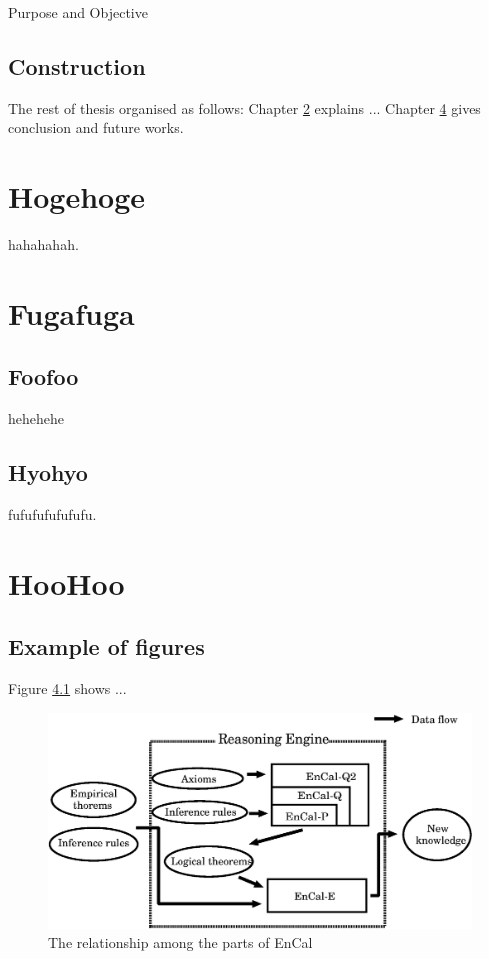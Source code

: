 \documentclass[12pt,epsf]{report}
\begin{document}
Purpose and Objective

\section{Construction}
The rest of thesis organised as follows:
Chapter \ref{chap:second} explains ... 
Chapter \ref{chap:third} gives conclusion and future works.


\chapter{Hogehoge} \label{chap:second}

hahahahah.

\chapter{Fugafuga}
\section{Foofoo}
hehehehe

\section{Hyohyo}

fufufufufufufu.

\chapter{HooHoo} \label{chap:third}

\section{Example of figures}

Figure \ref{fig:reasoning_engine} shows ...


 \begin{figure}[tb]
 \begin{center}
  \includegraphics[scale=0.6]{eps/reasoning_engine.eps}
  \caption{The relationship among the parts of EnCal}
  \label{fig:reasoning_engine}
 \end{center}
\end{figure}
\end{document}
